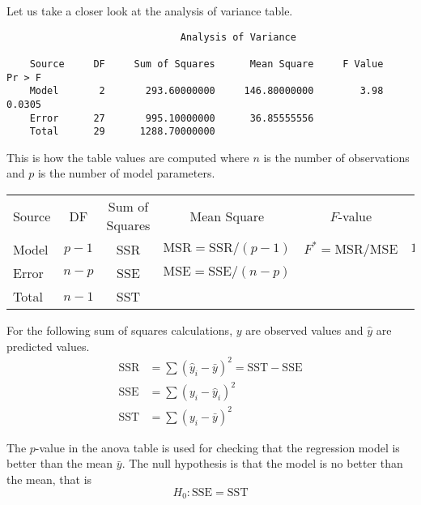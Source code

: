 \documentclass[12pt]{article}
\begin{document}
\newpage

Let us take a closer look at the analysis of variance table.

{\scriptsize\begin{verbatim}
                              Analysis of Variance

    Source     DF     Sum of Squares      Mean Square     F Value     Pr > F
    Model       2       293.60000000     146.80000000        3.98     0.0305
    Error      27       995.10000000      36.85555556                       
    Total      29      1288.70000000
\end{verbatim}}

This is how the table values are computed where $n$ is the number of observations
and $p$ is the number of model parameters.

{\scriptsize\begin{center}\begin{tabular}{lccccc}
Source & DF & Sum of Squares & Mean Square & $F$-value & $p$-value
\\
Model
& $p-1$
& SSR
& $\text{MSR}=\text{SSR}/(p-1)$
& $F^*=\text{MSR}/\text{MSE}$
& $1-F(F^*,p-1,n-p)$\\
Error
& $n-p$
& SSE
& $\text{MSE}=\text{SSE}/(n-p)$
& &\\
Total
& $n-1$
& SST
& & &
\end{tabular}\end{center}}

For the following sum of squares calculations, $y$ are observed values and $\hat y$ are predicted values.
\begin{align*}
\text{SSR}&=\sum(\hat y_i-\bar y)^2=\text{SST}-\text{SSE}
\\
\text{SSE}&=\sum(y_i-\hat y_i)^2
\\
\text{SST}&=\sum(y_i-\bar y)^2
\end{align*}


The $p$-value in the anova table is used for checking that the regression model
is better than the mean $\bar y$.
The null hypothesis is that the model is no better than the mean, that is
\begin{equation*}
H_0:\text{SSE}=\text{SST}
\end{equation*}

\end{document}
